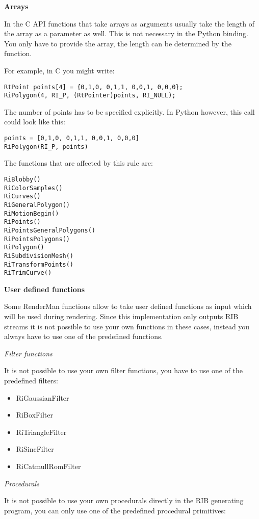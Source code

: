 {\bf Arrays}

In the C API functions that take arrays as arguments usually take the
length of the array as a parameter as well. This is not necessary in
the Python binding. You only have to provide the array, the length can
be determined by the function.

For example, in C you might write: 

\begin{verbatim}
RtPoint points[4] = {0,1,0, 0,1,1, 0,0,1, 0,0,0};
RiPolygon(4, RI_P, (RtPointer)points, RI_NULL); 
\end{verbatim}

The number of points has to be specified explicitly. In Python
however, this call could look like this:

\begin{verbatim}
points = [0,1,0, 0,1,1, 0,0,1, 0,0,0]
RiPolygon(RI_P, points) 
\end{verbatim}

The functions that are affected by this rule are: 

\begin{verbatim}
RiBlobby()
RiColorSamples()
RiCurves()
RiGeneralPolygon()
RiMotionBegin()
RiPoints()
RiPointsGeneralPolygons()
RiPointsPolygons()
RiPolygon()
RiSubdivisionMesh()
RiTransformPoints()
RiTrimCurve()
\end{verbatim}

{\bf User defined functions}

Some RenderMan functions allow to take user defined functions as input
which will be used during rendering. Since this implementation only
outputs RIB streams it is not possible to use your own functions in
these cases, instead you always have to use one of the predefined
functions.
 
{\em Filter functions}

It is not possible to use your own filter functions, you have to use
one of the predefined filters:

\begin{itemize}
\item RiGaussianFilter 
\item RiBoxFilter 
\item RiTriangleFilter 
\item RiSincFilter 
\item RiCatmullRomFilter 
\end{itemize}

{\em Procedurals}

It is not possible to use your own procedurals directly in the RIB
generating program, you can only use one of the predefined procedural
primitives:

